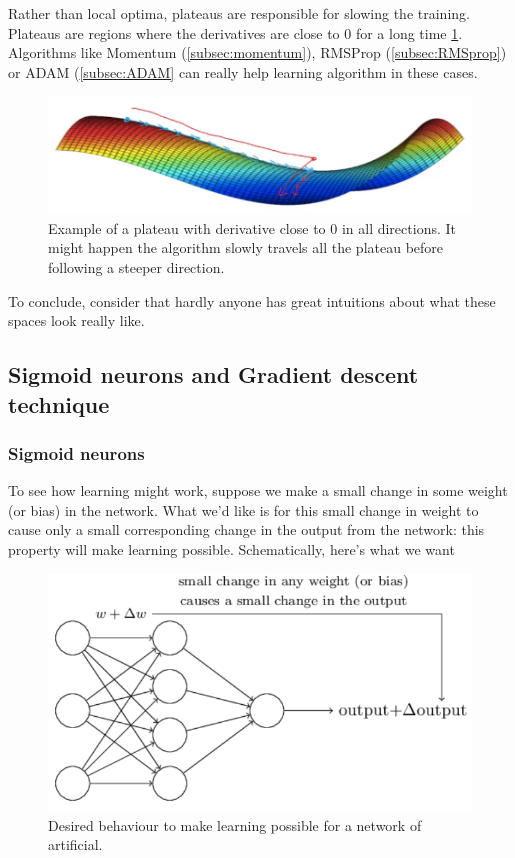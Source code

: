 Rather than local optima, plateaus are responsible for slowing the training. Plateaus are regions where the derivatives are close to $0$ for a long time \ref{img:plateau}. Algorithms like Momentum (\autoref{subsec:momentum}), RMSProp (\autoref{subsec:RMSprop}) or ADAM (\autoref{subsec:ADAM} can really help learning algorithm in these cases.

\begin{figure}
\centering
\includegraphics[scale=0.4]{img/plateau}
\caption{Example of a plateau with derivative close to $0$ in all directions. It might happen the algorithm slowly travels all the plateau before following a steeper direction.}
\label{img:plateau}
\end{figure}

To conclude, consider that hardly anyone has great intuitions about what these spaces look really like.

\subsection{Sigmoid neurons and Gradient descent technique}
\subsubsection{Sigmoid neurons}
To see how learning might work, suppose we make a small change in some weight (or bias) in the network. What we'd like is for this small change in weight to cause only a small corresponding change in the output from the network: this property will make learning possible. Schematically, here's what we want
\begin{figure}
\centering
\includegraphics[scale=0.4]{img/NNdeltaChange}
\caption{Desired behaviour to make learning possible for a network of artificial.}
\label{NNdeltaChange}
\end{figure}

